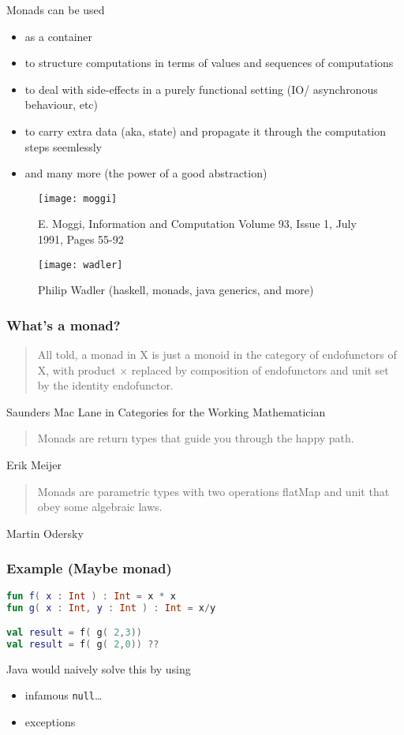 \documentclass[10pt]{beamer}
\begin{document}
\begin{frame}
Monads can be used 
	\begin{itemize}
		\item as a container 
		\item 
		to structure computations in terms of values and sequences of computations		
	\item to deal with side-effects in a purely functional setting (IO/ asynchronous behaviour, etc) 
 \item  to carry extra data (aka, state) and propagate it through the computation  steps seemlessly 
 \item and many more 
	(the power of a good abstraction)
	\end{itemize}
\end{frame}
\begin{frame}
	\begin{figure}
		\centering
		\texttt{[image: moggi]}
		\caption{E. Moggi, Information and Computation
		Volume 93, Issue 1, July 1991, Pages 55-92}
	\end{figure}
\end{frame}
\begin{frame}
	\begin{figure}
		\centering
		\texttt{[image: wadler]}
		\caption{Philip Wadler (haskell, monads, java generics, and more)}
	\end{figure}
\end{frame}
\begin{frame}\frametitle{What's a monad?}
	\begin{quotation}
		All told, a monad in X is just a monoid in the category of endofunctors of X, with product × replaced by composition of endofunctors and unit set by the identity endofunctor.
	\end{quotation}
	 Saunders Mac Lane in Categories for the Working Mathematician
	\begin{quotation}
		Monads are return types that guide you through the happy path.
	\end{quotation}
	Erik Meijer
	\begin{quotation}
Monads are parametric types with two operations flatMap and unit that obey some algebraic laws.
	\end{quotation}
	Martin Odersky
\end{frame}
\begin{frame}[fragile]
\frametitle{Example (Maybe monad)}
\begin{lstlisting}[language=Kotlin, basicstyle=\ttfamily]
fun f( x : Int ) : Int = x * x
fun g( x : Int, y : Int ) : Int = x/y

val result = f( g( 2,3))
val result = f( g( 2,0)) ??
\end{lstlisting}
Java would naively solve this by using 
	\begin{itemize}
	\item infamous \verb|null|\ldots 
	\item exceptions
	\end{itemize}
\end{frame}
\end{document}
